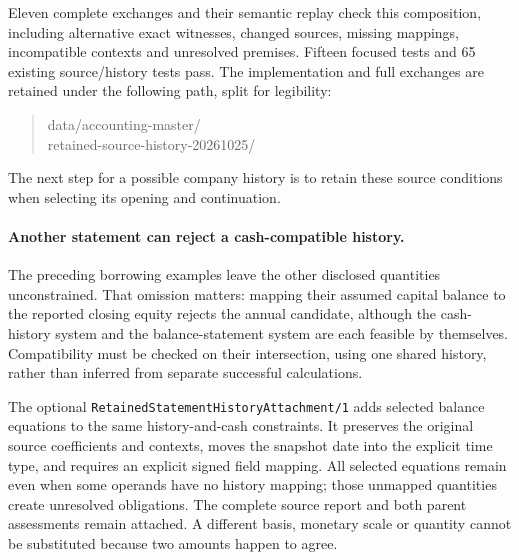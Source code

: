 Eleven complete exchanges and their semantic replay check this composition,
including alternative exact witnesses, changed sources, missing mappings,
incompatible contexts and unresolved premises. Fifteen focused tests and
65 existing source/history tests pass. The implementation and full exchanges
are retained under the following path, split for legibility:
\begin{quote}\small\ttfamily
data/accounting-master/\\
retained-source-history-20261025/
\end{quote}
The next step for a possible company history is to retain these source
conditions when selecting its opening and continuation.


\paragraph{Another statement can reject a cash-compatible history.}
The preceding borrowing examples leave the other disclosed quantities
unconstrained. That omission matters: mapping their assumed capital balance
to the reported closing equity rejects the annual candidate, although the
cash-history system and the balance-statement system are each feasible by
themselves. Compatibility must be checked on their intersection, using one
shared history, rather than inferred from separate successful calculations.

The optional \texttt{RetainedStatementHistoryAttachment/1} adds selected
balance equations to the same history-and-cash constraints. It preserves
the original source coefficients and contexts, moves the snapshot date into
the explicit time type, and requires an explicit signed field mapping.
All selected equations remain even when some operands have no history
mapping; those unmapped quantities create unresolved obligations. The
complete source report and both parent assessments remain attached. A
different basis, monetary scale or quantity cannot be substituted because
two amounts happen to agree.

